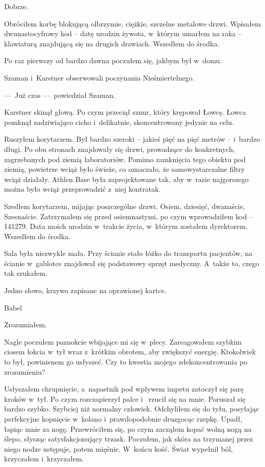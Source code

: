 Dobrze.

Obróciłem korbę blokującą olbrzymie, ciężkie, szczelne metalowe drzwi. Wpisałem dwunastocyfrowy kod -- datę urodzin 
żywota, w~którym umarłem na raka -- klawiaturą znajdującą się na drugich drzwiach. Wszedłem do środka.

Po raz pierwszy od bardzo dawna poczułem się, jakbym był w~domu.

\paraSep

Szaman i~Karstner obserwowali poczynania Nieśmiertelnego.

---~Już czas ---~powiedział Szaman. 

Karstner skinął głową. Po czym przeciął sznur, który krępował Łowcę. Łowca pomknął zadziwiająco cicho i~delikatnie, 
skoncentrowany jedynie na celu.

\paraSep

Ruszyłem korytarzem. Był bardzo szeroki -- jakieś pięć na pięć metrów -- i~bardzo długi. Po obu stronach znajdowały 
się drzwi, prowadzące do konkretnych, zagrzebanych pod ziemią laboratoriów. Pomimo zamknięcia tego obiektu pod 
ziemią, powietrze wciąż było świeże, co oznaczało, że samowystarczalne filtry wciąż działały. Athlen Base była 
zaprojektowane tak, aby w~razie najgorszego można było wciąż przeprowadzić z~niej kontratak.

Szedłem korytarzem, mijając poszczególne drzwi. Osiem, dziesięć, dwanaście, Szesnaście. Zatrzymałem się przed 
osiemnastymi, po czym wprowadziłem kod -- 141279. Data moich urodzin w~trakcie życia, w~którym zostałem dyrektorem. 
Wszedłem do środka.

Sala była niezwykle mała. Przy ścianie stało łóżko do transportu pacjentów, na ścianie w~gablotce znajdował się 
podstawowy sprzęt medyczny. A~także to, czego tak szukałem.

Jedno słowo, krzywo zapisane na oprawionej kartce.

\begin{itquote}
Babel
\end{itquote}

Zrozumiałem.

Nagle poczułem paznokcie wbijające mi się w~plecy. Zareagowałem szybkim ciosem łokcia w~tył wraz z~krótkim obrotem, 
aby zwiększyć energię. Ktokolwiek to był, powinienem go usłyszeć. Czy to kwestia mojego zdekoncentrowania po 
zrozumieniu? 

Usłyszałem chrupnięcie, a~napastnik pod wpływem impetu zatoczył się parę kroków w~tył. Po czym rozczapierzył palce i~
rzucił się na mnie. Poruszał się bardzo szybko. Szybciej niż normalny człowiek. Odchyliłem się do tyłu, posyłając 
perfekcyjne kopnięcie w~kolano i~prawdopodobnie druzgocąc rzepkę. Upadł, łapiąc mnie za nogę. Przewróciłem się, po 
czym zacząłem kopać wolną nogą na ślepo, słysząc satysfakcjonujący trzask. Poczułem, jak skóra na trzymanej przez 
niego nodze ustępuje, potem mięśnie. W~końcu kość. Świat wypełnił ból, krzyczałem i~krzyczałem.

